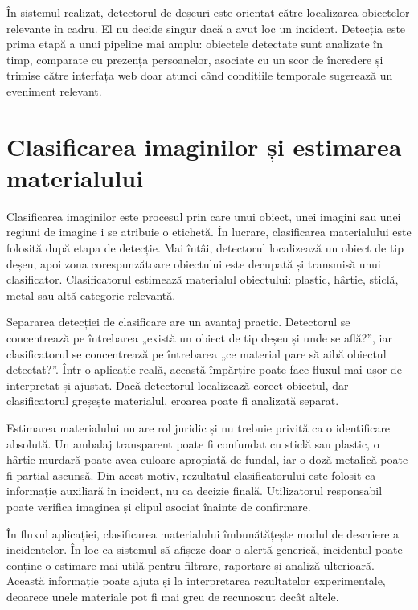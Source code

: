 În sistemul realizat, detectorul de deșeuri este orientat către localizarea obiectelor relevante în cadru. El nu decide singur dacă a avut loc un incident. Detecția este prima etapă a unui pipeline mai amplu: obiectele detectate sunt analizate în timp, comparate cu prezența persoanelor, asociate cu un scor de încredere și trimise către interfața web doar atunci când condițiile temporale sugerează un eveniment relevant.

\section{Clasificarea imaginilor și estimarea materialului}

Clasificarea imaginilor este procesul prin care unui obiect, unei imagini sau unei regiuni de imagine i se atribuie o etichetă. În lucrare, clasificarea materialului este folosită după etapa de detecție. Mai întâi, detectorul localizează un obiect de tip deșeu, apoi zona corespunzătoare obiectului este decupată și transmisă unui clasificator. Clasificatorul estimează materialul obiectului: plastic, hârtie, sticlă, metal sau altă categorie relevantă.

Separarea detecției de clasificare are un avantaj practic. Detectorul se concentrează pe întrebarea „există un obiect de tip deșeu și unde se află?”, iar clasificatorul se concentrează pe întrebarea „ce material pare să aibă obiectul detectat?”. Într-o aplicație reală, această împărțire poate face fluxul mai ușor de interpretat și ajustat. Dacă detectorul localizează corect obiectul, dar clasificatorul greșește materialul, eroarea poate fi analizată separat.

Estimarea materialului nu are rol juridic și nu trebuie privită ca o identificare absolută. Un ambalaj transparent poate fi confundat cu sticlă sau plastic, o hârtie murdară poate avea culoare apropiată de fundal, iar o doză metalică poate fi parțial ascunsă. Din acest motiv, rezultatul clasificatorului este folosit ca informație auxiliară în incident, nu ca decizie finală. Utilizatorul responsabil poate verifica imaginea și clipul asociat înainte de confirmare.

În fluxul aplicației, clasificarea materialului îmbunătățește modul de descriere a incidentelor. În loc ca sistemul să afișeze doar o alertă generică, incidentul poate conține o estimare mai utilă pentru filtrare, raportare și analiză ulterioară. Această informație poate ajuta și la interpretarea rezultatelor experimentale, deoarece unele materiale pot fi mai greu de recunoscut decât altele.

